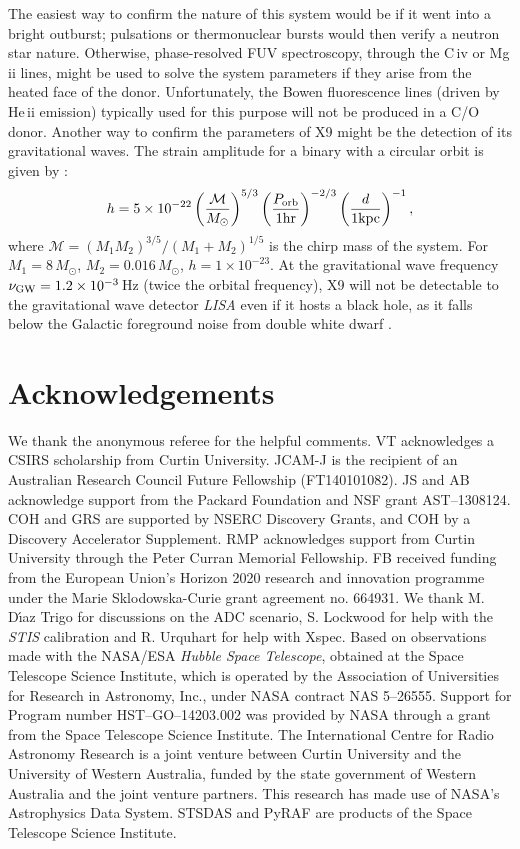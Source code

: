 \documentclass[a4paper,fleqn,usenatbib]{mnras}
\begin{document}
The easiest way to confirm the nature of this system would be if it went into a bright outburst; pulsations or thermonuclear bursts would then verify a neutron star nature. Otherwise, phase-resolved FUV spectroscopy, through the C\,{\sc iv} or Mg\,{\sc ii} lines, might be used to solve the system parameters if they arise from the heated face of the donor. Unfortunately, the Bowen fluorescence lines (driven by He\,{\sc ii} emission) typically used for this purpose will not be produced in a C/O donor. Another way to confirm the parameters of X9 might be the detection of its gravitational waves. The strain amplitude for a binary with a circular orbit is given by \citep{2004MNRAS.349..181N}:
\begin{equation}
h = 5 \times 10^{-22} \left( \frac{\mathcal{M}}{M_\odot} \right)^{5/3} \left( \frac{P_{\rm orb}}{\rm 1 hr} \right)^{-2/3} \left( \frac{d}{\rm 1 kpc} \right)^{-1} ,
\end{equation}
where $\mathcal{M} = (M_1 M_2)^{3/5} / (M_1 + M_2)^{1/5}$ is the chirp mass of the system. For $M_1 = 8\,M_\odot$, $M_2 = 0.016\,M_\odot$, $h = 1\times10^{-23}$. At the gravitational wave frequency $\nu_{\rm GW} = 1.2 \times 10^{-3}$\,Hz (twice the orbital frequency), X9 will not be detectable to the gravitational wave detector \textit{LISA} even if it hosts a black hole, as it falls below the Galactic foreground noise from double white dwarf \citep{2004MNRAS.349..181N}.

\section*{Acknowledgements}
We thank the anonymous referee for the helpful comments. VT acknowledges a CSIRS scholarship from Curtin University. JCAM-J is the recipient of an Australian Research Council Future Fellowship (FT140101082). JS and AB acknowledge support from the Packard Foundation and NSF grant AST--1308124. COH and GRS are supported by NSERC Discovery Grants, and COH by a Discovery Accelerator Supplement. RMP acknowledges support from Curtin University through the Peter Curran Memorial Fellowship. FB received funding from the European Union's Horizon 2020 research and innovation programme under the Marie Sklodowska-Curie grant agreement no. 664931. We thank M. D{\'{\i}}az Trigo for discussions on the ADC scenario, S. Lockwood for help with the {\it STIS} calibration and R. Urquhart for help with {\sc Xspec}. Based on observations made with the NASA/ESA {\it Hubble Space Telescope}, obtained at the Space Telescope Science Institute, which is operated by the Association of Universities for Research in Astronomy, Inc., under NASA contract NAS 5--26555. Support for Program number HST--GO--14203.002 was provided by NASA through a grant from the Space Telescope Science Institute. The International Centre for Radio Astronomy Research is a joint venture between Curtin University and the University of Western Australia, funded by the state government of Western Australia and the joint venture partners. This research has made use of NASA's Astrophysics Data System. STSDAS and PyRAF are products of the Space Telescope Science Institute.
\end{document}
